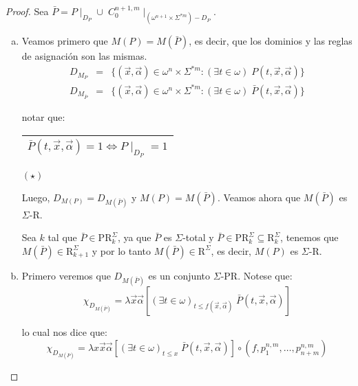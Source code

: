   \begin{proof}
    \PN Sea $\bar{P} = P \mid_{D_{P}} \cup \; C_{0}^{n+1,m} \mid_{(\omega^{n+1} \times \Sigma^{\ast m})-D_{P}}$.
    \begin{enumerate}[a)]
      \item Veamos primero que $M(P) = M(\bar{P})$, es decir, que los dominios y las reglas de asignación son las
        mismas.
        \begin{eqnarray*}
          D_{M_{P}} &=& \{(\vec{x},\vec{\alpha}) \in \omega^{n} \times \Sigma^{\ast m}: (\exists t \in \omega)
            \; P(t,\vec{x},\vec{\alpha})\} \\
          D_{M_{\bar{P}}} &=& \{(\vec{x},\vec{\alpha}) \in \omega^{n} \times \Sigma^{\ast m}: (\exists t \in
            \omega) \; \bar{P}(t,\vec{x},\vec{\alpha})\}
        \end{eqnarray*}

        \PN notar que:

        \begin{center} \begin{tabular}{|c|} \hline $\bar{P}(t,\vec{x},\vec{\alpha}) = 1 \Leftrightarrow P \mid_{D_{P}} =
        1$ \\\hline \end{tabular} $(\star)$ \end{center}

        \PN Luego, $D_{M(P)} = D_{M(\bar{P})}$ y $M(P) = M(\bar{P})$. Veamos ahora que $M(\bar{P})$ es $\Sigma$-R.

        \PN Sea $k$ tal que $\bar{P} \in \mathrm{PR}_{k}^{\Sigma}$, ya que $\bar{P}$ es $\Sigma$-total y $\bar{P} \in
        \mathrm{PR}_{k}^{\Sigma} \subseteq \mathrm{R}_{k}^{\Sigma}$, tenemos que $M(\bar{P}) \in
        \mathrm{R}_{k+1}^{\Sigma}$ y por lo tanto $M(\bar{P}) \in \mathrm{R}^{\Sigma}$, es decir, $M(P)$ es $\Sigma$-R.

      \item Primero veremos que $D_{M(\bar{P})}$ es un conjunto $\Sigma$-PR. Notese que:
        \[
          \chi_{D_{M(\bar{P})}} = \lambda \vec{x}\vec{\alpha} \left[(\exists t \in \omega)_{t \leq
          f(\vec{x},\vec{\alpha})} \; \bar{P}(t,\vec{x},\vec{\alpha})\right]
        \]

        \PN lo cual nos dice que:
        \[
          \chi_{D_{M(\bar{P})}} = \lambda x\vec{x}\vec{\alpha} \left[(\exists t \in \omega)_{t\leq x} \;
          \bar{P}(t,\vec{x},\vec{\alpha})\right] \circ (f,p_{1}^{n,m},\dotsc,p_{n+m}^{n,m})
        \]


\end{enumerate}
\end{proof}
